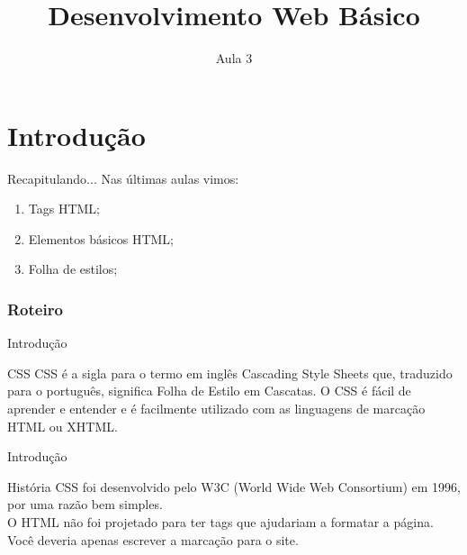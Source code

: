 \documentclass{beamer}
\title{Desenvolvimento Web Básico}
\subtitle{Aula 3}
\begin{document}
\frame{
 \titlepage
}

\section{Introdução}
\begin{frame}{Recapitulando...}
Nas últimas aulas vimos:
  \begin{enumerate}
   \item Tags HTML;
   \item Elementos básicos HTML;
   \item Folha de estilos;
  \end{enumerate}
\end{frame}
\begin{frame}
\frametitle{Roteiro} %
\tableofcontents %
\end{frame}
\begin{frame}{Introdução}
\begin{block}{CSS}
CSS é a sigla para o termo em inglês Cascading Style Sheets que, traduzido para o português, significa Folha de Estilo em Cascatas. O CSS é fácil de aprender e entender e é facilmente utilizado com as linguagens de marcação HTML ou XHTML. 
\end{block}
\end{frame}
\begin{frame}{Introdução}
\begin{block}{História}
CSS foi desenvolvido pelo W3C (World Wide Web Consortium) em 1996, por uma razão bem simples. \\
O HTML não foi projetado para ter tags que ajudariam a formatar a página. \\
Você deveria apenas escrever a marcação para o site.
\end{block}
\end{frame}
\end{document}
